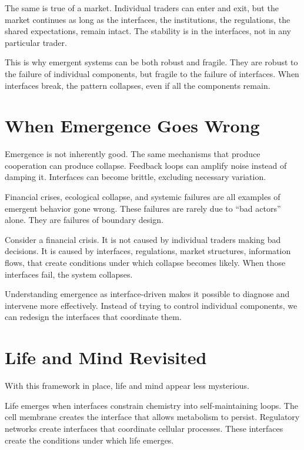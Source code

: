 \documentclass[
  openright]{book}
\begin{document}
The same is true of a market. Individual traders can enter and exit, but
the market continues as long as the interfaces, the institutions, the
regulations, the shared expectations, remain intact. The stability is in
the interfaces, not in any particular trader.

This is why emergent systems can be both robust and fragile. They are
robust to the failure of individual components, but fragile to the
failure of interfaces. When interfaces break, the pattern collapses,
even if all the components remain.

\section{When Emergence Goes Wrong}\label{when-emergence-goes-wrong}

Emergence is not inherently good. The same mechanisms that produce
cooperation can produce collapse. Feedback loops can amplify
noise instead of damping it. Interfaces can become brittle,
excluding necessary variation.

Financial crises, ecological collapse, and systemic failures are all
examples of emergent behavior gone wrong. These failures are rarely due
to ``bad actors'' alone. They are failures of boundary design.

Consider a financial crisis. It is not caused by individual traders
making bad decisions. It is caused by interfaces, regulations, market
structures, information flows, that create conditions under which
collapse becomes likely. When those interfaces fail, the system
collapses.

Understanding emergence as interface-driven makes it possible to
diagnose and intervene more effectively. Instead of trying to control
individual components, we can redesign the interfaces that coordinate
them.

\section{Life and Mind Revisited}\label{life-and-mind-revisited}

With this framework in place, life and mind appear less mysterious.

Life emerges when interfaces constrain chemistry into self-maintaining
loops. The cell membrane creates the interface that allows metabolism to
persist. Regulatory networks create interfaces that coordinate cellular
processes. These interfaces create the conditions under which life
emerges.
\end{document}
